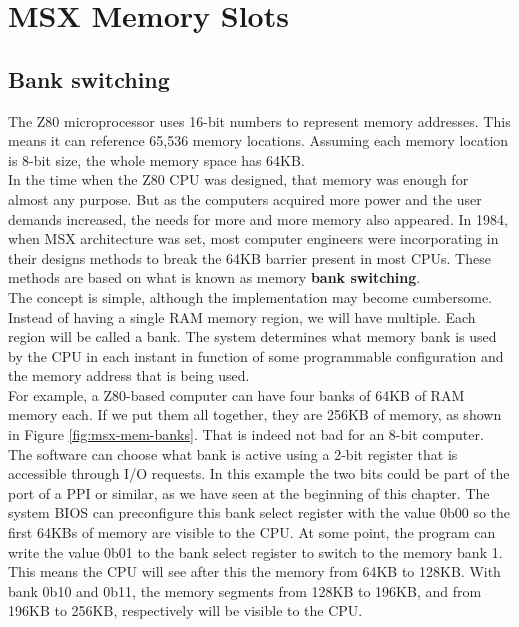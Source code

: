 \section{MSX Memory Slots}
\label{sec:msx-mem-slots}

\subsection{Bank switching}

The Z80 microprocessor uses 16-bit numbers to represent memory addresses. This means it can reference 65,536 memory locations. Assuming each memory location is 8-bit size, the whole memory space has 64KB. \\

In the time when the Z80 CPU was designed, that memory was enough for almost any purpose. But as the computers acquired more power and the user demands increased, the needs for more and more memory also appeared. In 1984, when MSX architecture was set, most computer engineers were incorporating in their designs methods to break the 64KB barrier present in most CPUs. These methods are based on what is known as memory {\bf bank switching}. \\

The concept is simple, although the implementation may become cumbersome. Instead of having a single RAM memory region, we will have multiple. Each region will be called a bank. The system determines what memory bank is used by the CPU in each instant in function of some programmable configuration and the memory address that is being used. \\

For example, a Z80-based computer can have four banks of 64KB of RAM memory each. If we put them all together, they are 256KB of memory, as shown in Figure \ref{fig:msx-mem-banks}. That is indeed not bad for an 8-bit computer. The software can choose what bank is active using a 2-bit register that is accessible through I/O requests. In this example the two bits could be part of the port of a PPI or similar, as we have seen at the beginning of this chapter. The system BIOS can preconfigure this bank select register with the value 0b00 so the first 64KBs of memory are visible to the CPU. At some point, the program can write the value 0b01 to the bank select register to switch to the memory bank 1. This means the CPU will see after this the memory from 64KB to 128KB. With bank 0b10 and 0b11, the memory segments from 128KB to 196KB, and from 196KB to 256KB, respectively will be visible to the CPU. \\

